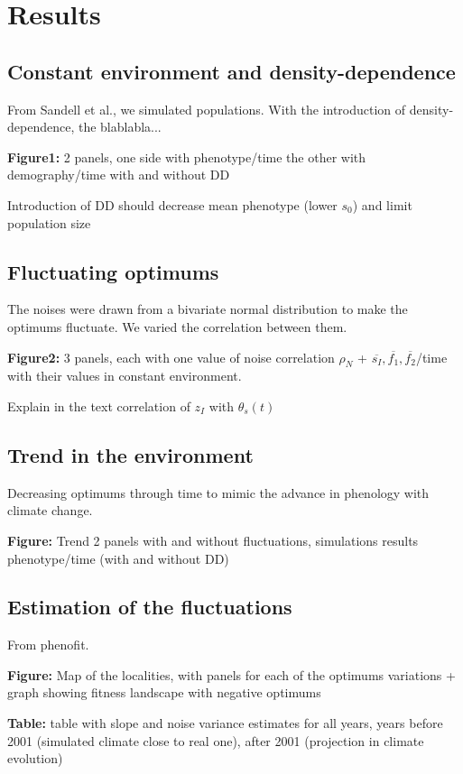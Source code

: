 \label{sec:Res}
\section*{Results}

\subsection*{Constant environment and density-dependence}

From Sandell et al., we simulated populations. With the introduction of density-dependence, the blablabla...

\textbf{Figure1:} 2 panels, one side with phenotype/time the other with demography/time with and without DD

Introduction of DD should decrease mean phenotype (lower $s_{0}$) and limit population size

\subsection*{Fluctuating optimums}

The noises were drawn from a bivariate normal distribution to make the optimums fluctuate. We varied the correlation between them.

\textbf{Figure2:} 3 panels, each with one value of noise correlation $\rho_{N}$ + $\overline{s_{I}}, \overline{f_{1}}, \overline{f_{2}}$/time with their values in constant environment.

Explain in the text correlation of $z_{I}$ with $\theta_{s}(t)$

\subsection*{Trend in the environment}

Decreasing optimums through time to mimic the advance in phenology with climate change.

\textbf{Figure:} Trend 2 panels with and without fluctuations, simulations results phenotype/time (with and without DD)

\subsection*{Estimation of the fluctuations}

From phenofit.

\textbf{Figure:} Map of the localities, with panels for each of the optimums variations + graph showing fitness landscape with negative optimums

\textbf{Table:} table with slope and noise variance estimates for all years, years before 2001 (simulated climate close to real one), after 2001 (projection in climate evolution)